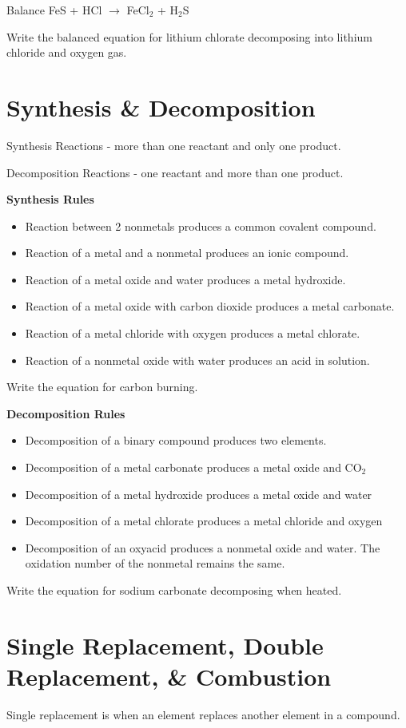 \documentclass[../hchem.tex]{subfiles}
\begin{document}
\ex Balance FeS + HCl $\rightarrow$ FeCl$_2$ + H$_2$S 

\ex Write the balanced equation for lithium chlorate decomposing into lithium chloride and oxygen gas. 

\section{Synthesis \& Decomposition}
Synthesis Reactions - more than one reactant and only one product.

Decomposition Reactions - one reactant and more than one product.

\textbf{Synthesis Rules}
\begin{itemize}
    \item Reaction between 2 nonmetals produces a common covalent compound.
    \item Reaction of a metal and a nonmetal produces an ionic compound.
    \item Reaction of a metal oxide and water produces a metal hydroxide.
    \item Reaction of a metal oxide with carbon dioxide produces a metal carbonate.
    \item Reaction of a metal chloride with oxygen produces a metal chlorate.
    \item Reaction of a nonmetal oxide with water produces an acid in solution.
\end{itemize}

\ex Write the equation for carbon burning.

\textbf{Decomposition Rules}
\begin{itemize}
    \item Decomposition of a binary compound produces two elements.
    \item Decomposition of a metal carbonate produces a metal oxide and CO$_2$
    \item Decomposition of a metal hydroxide produces a metal oxide and water 
    \item Decomposition of a metal chlorate produces a metal chloride and oxygen 
    \item Decomposition of an oxyacid produces a nonmetal oxide and water. The oxidation number of the nonmetal remains the same.
\end{itemize}

\ex Write the equation for sodium carbonate decomposing when heated.

\section{Single Replacement, Double Replacement, \& Combustion}
Single replacement is when an element replaces another element in a compound.
\end{document}
